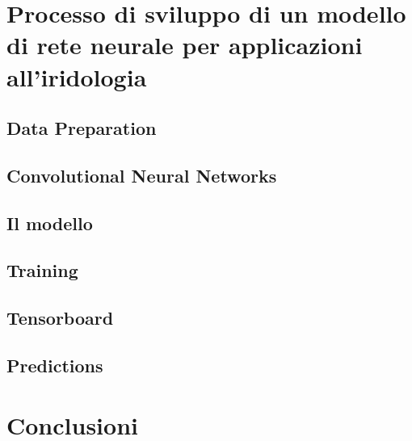 \documentclass[12pt,twoside,openright]{report}
\begin{document}
  \chapter{Processo di sviluppo di un modello di rete neurale per applicazioni all'iridologia}
  \section{Data Preparation}
  
  \section{Convolutional Neural Networks}
  
  \section{Il modello}
  
  \section{Training}
  
  \section{Tensorboard}
    
  \section{Predictions}
  
  
  \setcounter{secnumdepth}{-1}
  \chapter{Conclusioni}
  
  
\end{document}
